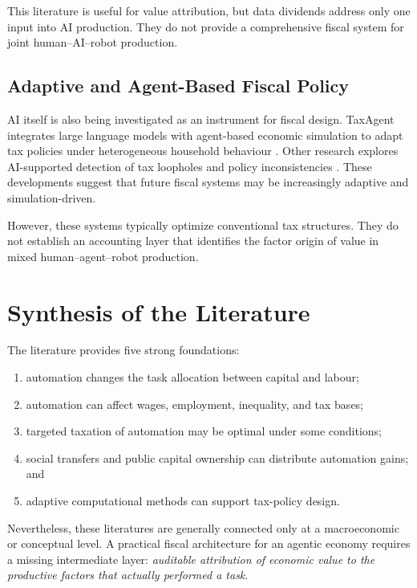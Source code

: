 \documentclass[conference]{IEEEtran}
\begin{document}
This literature is useful for value attribution, but data dividends address only
one input into AI production. They do not provide a comprehensive fiscal system
for joint human--AI--robot production.

\subsection{Adaptive and Agent-Based Fiscal Policy}

AI itself is also being investigated as an instrument for fiscal design.
TaxAgent integrates large language models with agent-based economic simulation
to adapt tax policies under heterogeneous household behaviour
\cite{TaxAgent2025}. Other research explores AI-supported detection of tax
loopholes and policy inconsistencies \cite{Fratric2025}. These developments
suggest that future fiscal systems may be increasingly adaptive and
simulation-driven.

However, these systems typically optimize conventional tax structures. They do
not establish an accounting layer that identifies the factor origin of value in
mixed human--agent--robot production.

\section{Synthesis of the Literature}

The literature provides five strong foundations:

\begin{enumerate}
\item automation changes the task allocation between capital and labour;
\item automation can affect wages, employment, inequality, and tax bases;
\item targeted taxation of automation may be optimal under some conditions;
\item social transfers and public capital ownership can distribute automation
gains; and
\item adaptive computational methods can support tax-policy design.
\end{enumerate}

Nevertheless, these literatures are generally connected only at a macroeconomic
or conceptual level. A practical fiscal architecture for an agentic economy
requires a missing intermediate layer: \textit{auditable attribution of
economic value to the productive factors that actually performed a task}.
\end{document}
